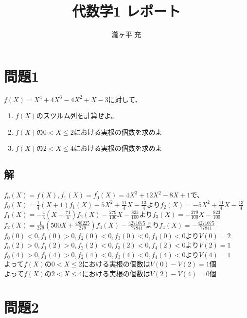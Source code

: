 \documentclass[12pt,a4paper]{article}
\title{代数学1 レポート}
\author{瀧ヶ平 充}
\begin{document}
  \begin{titlepage}
    \maketitle  
  \end{titlepage}

\section*{問題1}
  $f(X) = X^4 + 4X^3 - 4X^2 + X -3$に対して、
  \begin{enumerate}
    \item $f(X)$のスツルム列を計算せよ。
    \item $f(X)$の$0 < X \leq 2$における実根の個数を求めよ
    \item $f(X)$の$2 < X \leq 4$における実根の個数を求めよ
  \end{enumerate}

  \subsection*{解}

    $f_0(X) = f(X), f_1(X) = f_0^\prime(X) = 4X^3 + 12X^2 - 8X + 1$で、\\
    $f_0(X) = \frac{1}{4}(X + 1)f_1(X) - 5X^2 + \frac{11}{4} X - \frac{13}{4}$より$f_2(X) = - 5X^2 + \frac{11}{4} X - \frac{13}{4}$\\
    $f_1(X) = - \frac{4}{5}(X + \frac{71}{5})f_2(X) - \frac{279}{100} X - \frac{823}{100}$より$f_3(X) = - \frac{279}{100} X - \frac{823}{100}$\\
    $f_2(X) = \frac{1}{279}(500X + \frac{488225}{279})f_3(X) -\frac{4271075}{77841}$より$f_4(X) = -\frac{4271075}{77841}$\\
    $f_0(0) < 0, f_1(0) > 0, f_2(0) < 0, f_3(0) < 0, f_4(0) < 0$より$V(0)=2$\\
    $f_0(2) > 0, f_1(2) > 0, f_2(2) < 0, f_3(2) < 0, f_4(2) < 0$より$V(2)=1$\\
    $f_0(4) > 0, f_1(4) > 0, f_2(4) < 0, f_3(4) < 0, f_4(4) < 0$より$V(4)=1$\\
    よって$f(X)$の$0 < X \leq 2$における実根の個数は$V(0) - V(2) = 1$個\\
    よって$f(X)$の$2 < X \leq 4$における実根の個数は$V(2) - V(4) = 0$個

\newpage

\section*{問題2}
\end{document}
